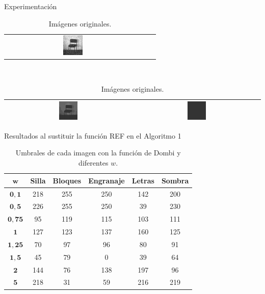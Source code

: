 \documentclass{beamer}
\theoremstyle{plain} %
\theoremstyle{definition}
\newcommand{\bb}{\bfseries}
\begin{document}
\begin{frame}[squeeze]{Experimentación}
\begin{table}
\begin{tabular}{ccc}
    \includegraphics[width=0.15\textwidth]{img/orig/chairsp020.jpg}\\
    \end{tabular}\\
    \begin{tabular}{cc}
    \includegraphics[width=0.15\textwidth]{img/orig/chairbcon.jpg} &
    \includegraphics[width=0.15\textwidth]{img/orig/chairmuybcon.jpg}\\\hline
    \end{tabular}
  \caption{Imágenes originales.}
  \end{table}
\end{frame}

\begin{frame}{Resultados al sustituir la función REF en el Algoritmo 1}
  \begin{table}
  \centering
  \begin{tabular}{c||c|c|c|c|c}
  $\mathbf{w}$    &\bb Silla&\bb Bloques&\bb Engranaje&\bb Letras&\bb Sombra\\\hline\hline
  $\mathbf{0,1}$  &   218   &    255    &     250     &   142    &   200  \\\hline
  $\mathbf{0,5}$  &   226   &    255    &     250     &    39    &   230  \\\hline
  $\mathbf{0,75}$ &    95   &    119    &     115     &   103    &   111  \\\hline
  $\mathbf{1}$    &   127   &    123    &     137     &   160    &   125  \\\hline
  $\mathbf{1,25}$ &    70   &     97    &      96     &    80    &    91  \\\hline
  $\mathbf{1,5}$  &    45   &     79    &      0      &    39    &    64  \\\hline
  $\mathbf{2}$    &   144   &     76    &     138     &   197    &    96  \\\hline
  $\mathbf{5}$    &   218   &     31    &      59     &   216    &   219  \\\hline
  \end{tabular}
  \caption{Umbrales de cada imagen con la función de Dombi y diferentes $w$.\label{tab:resultexp1dombi}}
  \end{table}
\end{frame}
\end{document}
